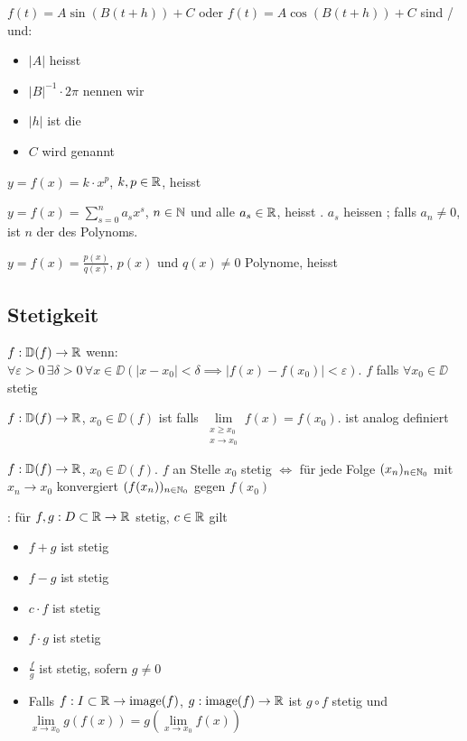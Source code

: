 \Def $f(t) = A \sin(B(t+h)) + C$ oder $f(t) = A\cos(B(t+h))+C$ sind / und:
\vspace{-0.6em}
\begin{itemize}
    \item $|A|$ heisst 
    \item $|B|^{-1} \cdot 2\pi$ nennen wir 
    \item $|h|$ ist die 
    \item $C$ wird  genannt
\end{itemize}

\Def $y = f(x) = k\cdot x^p$, $k,p \in \mathbb{R}$, heisst 

\Def $y = f(x) = \sum_{s=0}^{n} a_s x^s$, $n \in \mathbb{N}$ und alle $a_s \in \mathbb{R}$, heisst .
$a_s$ heissen ; falls $a_n \ne 0$, ist $n$ der  des Polynoms.

\Def $y = f(x) = \frac{p(x)}{q(x)}$, $p(x)$ und $q(x) \ne 0$ Polynome, heisst 

\subsection{Stetigkeit}

\Def $f: \mathbb{D}(f) \to \mathbb{R}$  wenn:
$\forall \varepsilon > 0 \, \exists \delta > 0 \, \forall x \in \DD (|x - x_0| < \delta \implies |f(x) - f(x_0)| < \varepsilon)$.
$f$  falls $\forall x_0 \in \DD$ stetig

\Def $f: \mathbb{D}(f) \to \mathbb{R}$, $x_0 \in \DD(f)$ ist  falls
$\lim\limits_{\substack{x\ge x_0 \\ x \to x_0}} f(x) = f(x_0)$.
 ist analog definiert

\Satz $f: \mathbb{D}(f) \to \mathbb{R}$, $x_0 \in \DD(f)$. $f$ an Stelle $x_0$ stetig $\iff$
für jede Folge $(x_n)_{n\in\mathbb{N}_0}$ mit $x_n \to x_0$ konvergiert $(f(x_n))_{n\in\mathbb{N}_0}$ gegen $f(x_0)$

\Satz {}: für $f,g: D \subset \mathbb{R} \to \mathbb{R}$ stetig, $c \in \mathbb{R}$ gilt
\vspace{-0.6em}
\begin{itemize}
    \item $f + g$ ist stetig
    \item $f - g$ ist stetig
    \item $c \cdot f$ ist stetig
    \item $f \cdot g$ ist stetig
    \item $\frac{f}{g}$ ist stetig, sofern $g \ne 0$
    \item Falls $f: I \subset \mathbb{R} \to \operatorname{image}(f)$, $g: \operatorname{image}(f) \to \mathbb{R}$ ist
    $g \circ f$ stetig und $\lim\limits_{x\to x_0} g(f(x)) = g(\lim\limits_{x\to x_0}f(x))$
\end{itemize}

